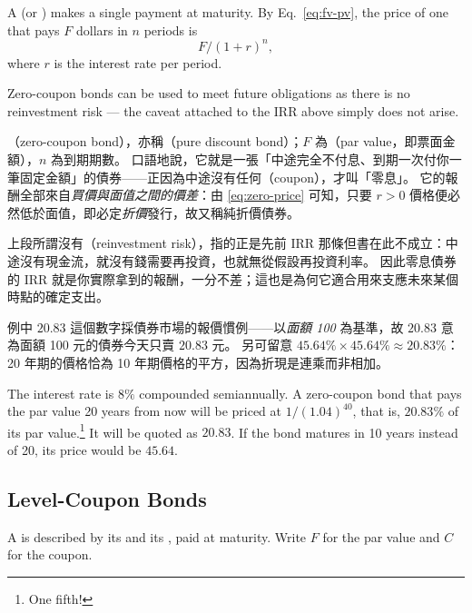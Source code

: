 \begin{definition}
	A  (or ) makes a single payment at maturity.
	By Eq.~\eqref{eq:fv-pv}, the price of one that pays $F$ dollars in $n$ periods is
	\begin{equation}
		F/(1+r)^{n} , \label{eq:zero-price}
	\end{equation}
	where $r$ is the interest rate per period.
\end{definition}

Zero-coupon bonds can be used to meet future obligations as there is no reinvestment risk --- the caveat attached to the IRR above simply does not arise.

\suppstart
\begin{remark}
	（zero-coupon bond），亦稱（pure discount bond）；$F$ 為（par value，即票面金額），$n$ 為到期期數。
	口語地說，它就是一張「中途完全不付息、到期一次付你一筆固定金額」的債券——正因為中途沒有任何（coupon），才叫「零息」。
	它的報酬全部來自\emph{買價與面值之間的價差}：由 \eqref{eq:zero-price} 可知，只要 $r > 0$ 價格便必然低於面值，即必定\emph{折價}發行，故又稱純折價債券。

	上段所謂沒有（reinvestment risk），指的正是先前 IRR 那條但書在此不成立：中途沒有現金流，就沒有錢需要再投資，也就無從假設再投資利率。
	因此零息債券的 IRR 就是你實際拿到的報酬，一分不差；這也是為何它適合用來支應未來某個時點的確定支出。

	例中 $20.83$ 這個數字採債券市場的報價慣例——以\emph{面額 100} 為基準，故 $20.83$ 意為面額 100 元的債券今天只賣 $20.83$ 元。
	另可留意 $45.64\% \times 45.64\% \approx 20.83\%$：20 年期的價格恰為 10 年期價格的平方，因為折現是連乘而非相加。
\end{remark}
\suppend

\begin{eg}
	The interest rate is $8\%$ compounded semiannually.
	A zero-coupon bond that pays the par value 20 years from now will be priced at $1/(1.04)^{40}$, that is, $20.83\%$ of its par value.\footnote{One fifth!} It will be quoted as $20.83$.
	If the bond matures in 10 years instead of 20, its price would be $45.64$.
\end{eg}

\subsection{Level-Coupon Bonds}

A  is described by its  and its , paid at maturity.
Write $F$ for the par value and $C$ for the coupon.

